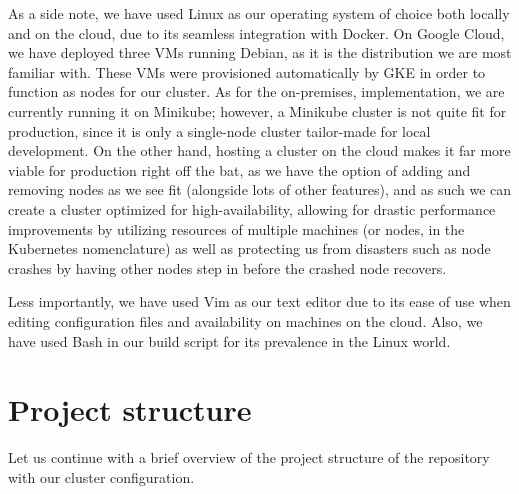 \documentclass[thesis=B,english]{FITthesis}[2019/12/23]
\begin{document}
As a side note, we have used Linux as our operating system of choice both locally and on the cloud, due to its seamless integration with Docker. On Google Cloud, we have deployed three VMs running Debian, as it is the distribution we are most familiar with. These VMs were provisioned automatically by GKE in order to function as nodes for our cluster. As for the on-premises, implementation, we are currently running it on Minikube; however, a Minikube cluster is not quite fit for production, since it is only a single-node cluster tailor-made for local development. On the other hand, hosting a cluster on the cloud makes it far more viable for production right off the bat, as we have the option of adding and removing nodes as we see fit (alongside lots of other features), and as such we can create a cluster optimized for high-availability, allowing for drastic performance improvements by utilizing resources of multiple machines (or nodes, in the Kubernetes nomenclature) as well as protecting us from disasters such as node crashes by having other nodes step in before the crashed node recovers. \cite{high-availability}

Less importantly, we have used Vim as our text editor due to its ease of use when editing configuration files and availability on machines on the cloud. Also, we have used Bash in our build script for its prevalence in the Linux world.


\section{Project structure}

Let us continue with a brief overview of the project structure of the repository with our cluster configuration.
\end{document}
